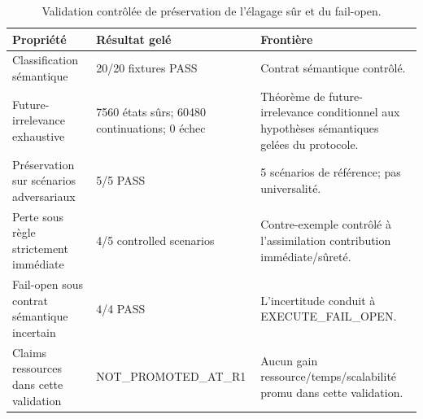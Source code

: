 \begin{table}[t]
\centering
\caption{Validation contrôlée de préservation de l'élagage sûr et du fail-open.}
\label{tab:nh-r1-safe}
\small
\begin{tabular}{p{}p{}p{}}
\hline
Propriété & Résultat gelé & Frontière \\
\hline
Classification sémantique & 20/20 fixtures PASS & Contrat sémantique contrôlé. \\
Future-irrelevance exhaustive & 7560 états sûrs; 60480 continuations; 0 échec & Théorème de future-irrelevance conditionnel aux hypothèses sémantiques gelées du protocole. \\
Préservation sur scénarios adversariaux & 5/5 PASS & 5 scénarios de référence; pas universalité. \\
Perte sous règle strictement immédiate & 4/5 controlled scenarios & Contre-exemple contrôlé à l'assimilation contribution immédiate/sûreté. \\
Fail-open sous contrat sémantique incertain & 4/4 PASS & L'incertitude conduit à EXECUTE\_FAIL\_OPEN. \\
Claims ressources dans cette validation & NOT\_PROMOTED\_AT\_R1 & Aucun gain ressource/temps/scalabilité promu dans cette validation. \\
\hline
\end{tabular}
\end{table}
